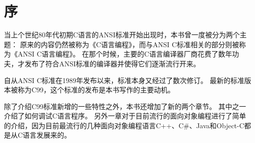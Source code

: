 \chapter{序}
{
    当上个世纪80年代初期C语言的ANSI标准开始出现时，本书曾一度被分为两个主题：
    原来的内容仍然被称为《C语言编程》，而与ANSI C标准相关的部分则被称为《ANSI C语言编程》。
    在那个时候，主要的C语言编译器厂商花费了数年功夫，才发布了符合ANSI标准的编译器并使得它们逐渐流行开来。

    自从ANSI C标准在1989年发布以来，标准本身又经过了数次修订。
    最新的标准版本被称为C99，这个标准的发布是本书写作的主要动机。

    除了介绍C99标准新增的一些特性之外，本书还增加了新的两个章节。
    其中之一介绍了如何调试C语言程序。
    另外一章对于目前流行的面向对象编程进行了简单的介绍，因为目前最流行的几种面向对象编程语言C++、C#、Java和Object-C都是从C语言发展来的。
}

\cleardoublepage

\endinput
